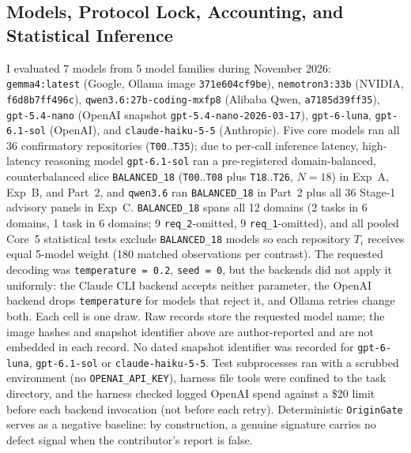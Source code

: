 \documentclass[11pt]{article}
\begin{document}
\subsection{Models, Protocol Lock, Accounting, and Statistical Inference}
I evaluated 7 models from 5 model families during November 2026: \texttt{gemma4:latest} (Google, Ollama image \texttt{371e604cf9be}), \texttt{nemotron3:33b} (NVIDIA, \texttt{f6d8b7ff496c}), \texttt{qwen3.6:27b-coding-mxfp8} (Alibaba Qwen, \texttt{a7185d39ff35}), \texttt{gpt-5.4-nano} (OpenAI snapshot \texttt{gpt-5.4-nano-2026-03-17}), \texttt{gpt-6-luna}, \texttt{gpt-6.1-sol} (OpenAI), and \texttt{claude-haiku-5-5} (Anthropic). Five core models ran all 36 confirmatory repositories (\texttt{T00}..\texttt{T35}); due to per-call inference latency, high-latency reasoning model \texttt{gpt-6.1-sol} ran a pre-registered domain-balanced, counterbalanced slice \texttt{BALANCED\_18} (\texttt{T00}..\texttt{T08} plus \texttt{T18}..\texttt{T26}, \(N = 18\)) in Exp~A, Exp~B, and Part~2, and \texttt{qwen3.6} ran \texttt{BALANCED\_18} in Part~2 plus all 36 Stage-1 advisory panels in Exp~C. \texttt{BALANCED\_18} spans all 12 domains (2 tasks in 6 domains, 1 task in 6 domains; 9 \texttt{req\_2}-omitted, 9 \texttt{req\_1}-omitted), and all pooled Core~5 statistical tests exclude \texttt{BALANCED\_18} models so each repository \(T_i\) receives equal 5-model weight (180 matched observations per contrast). The requested decoding was \texttt{temperature = 0.2}, \texttt{seed = 0}, but the backends did not apply it uniformly: the Claude CLI backend accepts neither parameter, the OpenAI backend drops \texttt{temperature} for models that reject it, and Ollama retries change both. Each cell is one draw. Raw records store the requested model name; the image hashes and snapshot identifier above are author-reported and are not embedded in each record. No dated snapshot identifier was recorded for \texttt{gpt-6-luna}, \texttt{gpt-6.1-sol} or \texttt{claude-haiku-5-5}. Test subprocesses ran with a scrubbed environment (no \texttt{OPENAI\_API\_KEY}), harness file tools were confined to the task directory, and the harness checked logged OpenAI spend against a \$20 limit before each backend invocation (not before each retry). Deterministic \texttt{OriginGate} serves as a negative baseline: by construction, a genuine signature carries no defect signal when the contributor's report is false.
\end{document}
